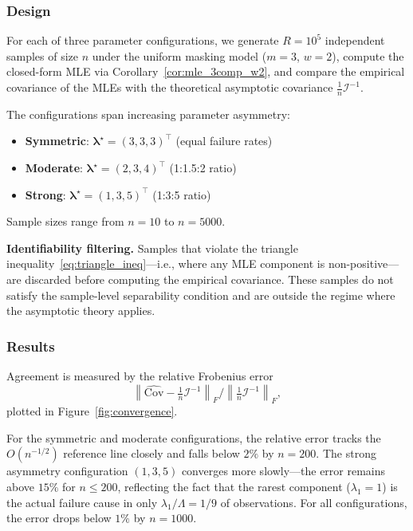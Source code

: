 \documentclass[12pt]{article}
\newcommand{\tparam}[1]{{#1}^{\star}}  %
\newcommand{\infomatrx}{\mathcal{I}}
\renewcommand{\vec}[1]{\boldsymbol{#1}}
\theoremstyle{definition}
\theoremstyle{remark}
\begin{document}
\subsubsection{Design}

For each of three parameter configurations, we generate $R = 10^5$ independent samples of size $n$ under the uniform masking model ($m=3$, $w=2$), compute the closed-form MLE via Corollary~\ref{cor:mle_3comp_w2}, and compare the empirical covariance of the MLEs with the theoretical asymptotic covariance $\frac{1}{n}\infomatrx^{-1}$.

The configurations span increasing parameter asymmetry:
\begin{itemize}
\item \textbf{Symmetric}: $\tparam{\vec{\lambda}} = (3, 3, 3)^\top$ (equal failure rates)
\item \textbf{Moderate}: $\tparam{\vec{\lambda}} = (2, 3, 4)^\top$ (1:1.5:2 ratio)
\item \textbf{Strong}: $\tparam{\vec{\lambda}} = (1, 3, 5)^\top$ (1:3:5 ratio)
\end{itemize}
Sample sizes range from $n = 10$ to $n = 5000$.

\textbf{Identifiability filtering.} Samples that violate the triangle inequality~\eqref{eq:triangle_ineq}---i.e., where any MLE component is non-positive---are discarded before computing the empirical covariance. These samples do not satisfy the sample-level separability condition and are outside the regime where the asymptotic theory applies.

\subsubsection{Results}

Agreement is measured by the relative Frobenius error
\begin{equation*}
\left\|\widehat{\mathrm{Cov}} - \tfrac{1}{n}\infomatrx^{-1}\right\|_F \Big/ \left\|\tfrac{1}{n}\infomatrx^{-1}\right\|_F,
\end{equation*}
plotted in Figure~\ref{fig:convergence}.

For the symmetric and moderate configurations, the relative error tracks the $O(n^{-1/2})$ reference line closely and falls below $2\%$ by $n = 200$. The strong asymmetry configuration $(1,3,5)$ converges more slowly---the error remains above $15\%$ for $n \leq 200$, reflecting the fact that the rarest component ($\lambda_1 = 1$) is the actual failure cause in only $\lambda_1/\Lambda = 1/9$ of observations. For all configurations, the error drops below $1\%$ by $n = 1000$.
\end{document}
